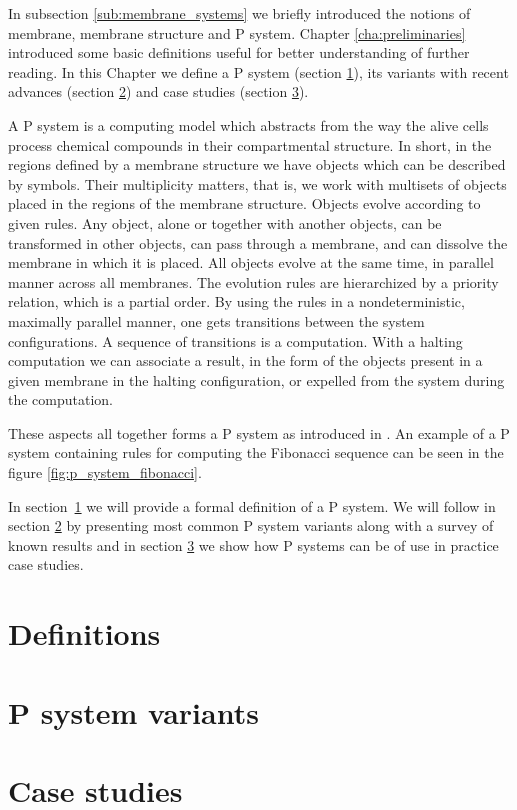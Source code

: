 In subsection \ref{sub:membrane_systems} we briefly introduced the notions of membrane, membrane structure and P system. Chapter \ref{cha:preliminaries} introduced some basic definitions useful for better understanding of further reading. In this Chapter we define a P system (section \ref{sec:definitions}), its variants with recent advances (section \ref{sec:p_system_variants}) and case studies (section \ref{sec:case_studies}).

A P system \cite{Paun98} is a computing model which abstracts from the way the alive cells process chemical compounds in their compartmental structure. In short, in the regions defined by a membrane structure we have objects which can be described by symbols. Their multiplicity matters, that is, we work with multisets of objects placed in the regions of the membrane structure. Objects evolve according to given rules. Any object, alone or together with another objects, can be transformed in other objects, can pass through a membrane, and can dissolve the membrane in which it is placed. All objects evolve at the same time, in parallel manner across all membranes. The evolution rules are hierarchized by a priority relation, which is a partial order. By using the rules in a nondeterministic, maximally parallel manner, one gets transitions between the system configurations. A sequence of transitions is a computation. With a halting computation we can associate a result, in the form of the objects present in a given membrane in the halting configuration, or expelled from the system during the computation.


These aspects all together forms a P system as introduced in \cite{Paun98}. An example of a P system containing rules for computing the Fibonacci sequence can be seen in the figure \ref{fig:p_system_fibonacci}.

In section~\ref{sec:definitions} we will provide a formal definition of a P system. We will follow in section \ref{sec:p_system_variants} by presenting most common P system variants along with a survey of known results and in section \ref{sec:case_studies} we show how P systems can be of use in practice case studies.

\section{Definitions} %
\label{sec:definitions}



\section{P system variants} %
\label{sec:p_system_variants}



\section{Case studies} %
\label{sec:case_studies}



